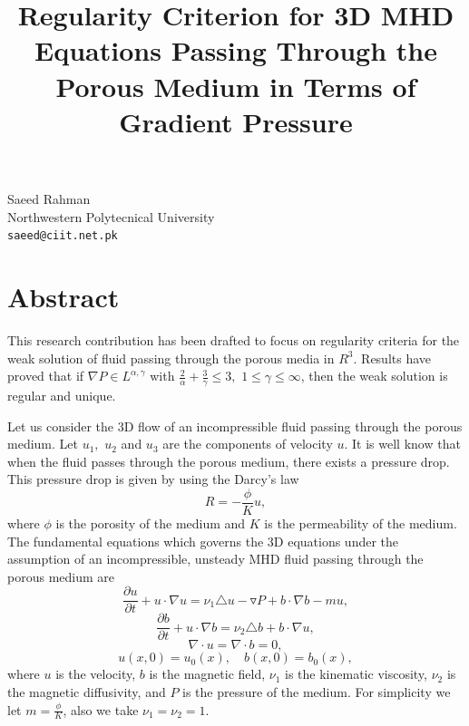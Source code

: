 \documentclass[article, A4, 11pt]{llncs}%
\begin{document}
\title{Regularity Criterion for 3D MHD Equations Passing Through the Porous Medium in Terms of Gradient Pressure}
 \author{} \institute{}
\maketitle
\begin{center}
{\large Saeed  Rahman}\\
Northwestern Polytecnical University\\
{\tt saeed@ciit.net.pk}
\end{center}

\section*{Abstract}
This research contribution has been drafted to focus on regularity criteria for the weak solution of fluid passing through the porous media in $R^{3}$.  Results have proved that if $ \nabla P\in L^{\alpha,\gamma}$ with $\frac {2}{\alpha}+\frac {3}{\gamma}\leq3,$ $1\leq\gamma\leq\infty$, then the weak solution is regular and unique.

Let us consider the 3D flow of an incompressible fluid passing through the porous medium. Let $u_{1},$ $u_{2}$ and $u_{3}$ are the components of velocity
$u.$ It is well know that when the fluid passes through the porous medium, there exists a pressure drop. This pressure drop is given by using the Darcy's law
\begin{equation*}
R=-\frac {\phi} {K} u,
\end{equation*}
where $\phi$ is the porosity of the medium and $K$ is the permeability of the medium. The fundamental equations which governs the 3D equations under the assumption of an incompressible, unsteady MHD fluid passing through the porous medium are
\begin{equation}
\frac{\partial u}{\partial t}+u\cdot\nabla u
=\nu_{1}\triangle u-\triangledown P+
b\cdot\nabla b-mu,
\end{equation}
\begin{equation}
\frac{\partial b}{\partial t}+u\cdot\nabla b
=\nu_{2}\triangle b + b\cdot\nabla u,
\end{equation}
\begin{equation}
\nabla\cdot u= \nabla\cdot b=0,
\end{equation}
\begin{equation}\label {6}
u(x,0)=u_{0}(x),
\quad b(x,0)=b_{0}(x),
\end{equation}
where $u$ is the velocity, $b$ is the magnetic field, $\nu_{1}$ is the kinematic viscosity, $\nu_{2}$ is the magnetic diffusivity, and $P$ is the pressure of the medium. For simplicity we let $m=\frac {\phi}{K}$, also we take $\nu_{1}=\nu_{2}=1.$
\end{document}
